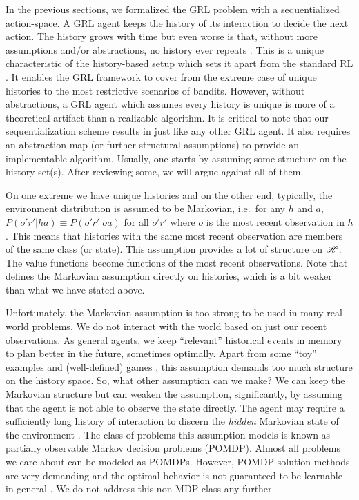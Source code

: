 \documentclass{article} %
\begin{document}
In the previous sections, we formalized the GRL problem with a sequentialized action-space. A GRL agent keeps the history of its interaction to decide the next action. The history grows with time but even worse is that, without more assumptions and/or abstractions, no history ever repeats \cite{Hutter2009}. This is a unique characteristic of the history-based setup which sets it apart from the standard RL \cite{Sutton2018}. It enables the GRL framework to cover from the extreme case of unique histories to the most restrictive scenarios of bandits. However, without abstractions, a GRL agent which assumes every history is unique is more of a theoretical artifact than a realizable algorithm. It is critical to note that our sequentialization scheme results in just like any other GRL agent. It also requires an abstraction map (or further structural assumptions) to provide an implementable algorithm. Usually, one starts by assuming some structure on the history set(s). After reviewing some, we will argue against all of them.

On one extreme we have unique histories and on the other end, typically, the environment distribution is assumed to be Markovian, i.e.\ for any $h$ and $a$, $P(o'r'|ha) \equiv P(o'r'|oa)$ for all $o'r'$ where $o$ is the most recent observation in $h$ \cite{Sutton2018}. This means that histories with the same most recent observation are members of the same class (or state).
This assumption provides a lot of structure on $\mathscr{H}$. The value functions become functions of the most recent observations. Note that \citet{Hutter2016} defines the Markovian assumption directly on histories, which is a bit weaker than what we have stated above.

Unfortunately, the Markovian assumption is too strong to be used in many real-world problems. We do not interact with the world based on just our recent observations. As general agents, we keep ``relevant'' historical events in memory to plan better in the future, sometimes optimally. Apart from some ``toy'' examples and (well-defined) games \cite{Mnih2015,Silver2016,Silver2018}, this assumption demands too much structure on the history space. So, what other assumption can we make? We can keep the Markovian structure but can weaken the assumption, significantly, by assuming that the agent is not able to observe the state directly. The agent may require a sufficiently long history of interaction to discern the \emph{hidden} Markovian state of the environment \cite{Kaelbling1998}. The class of problems this assumption models is known as partially observable Markov decision problems (POMDP). Almost all problems we care about can be modeled as POMDPs. However, POMDP solution methods are very demanding and the optimal behavior is not guaranteed to be learnable in general \cite{Pendrith1998}. We do not address this non-MDP class any further.
\end{document}
